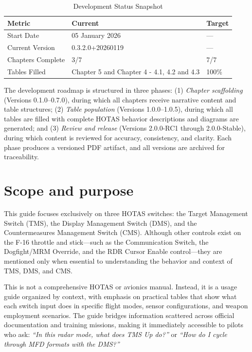 \documentclass[11pt, a4paper, twoside]{report}
\newcommand{\docversion}{0.3.2.0}
\newcommand{\docbuild}{20260119}
\newcommand{\docstartdate}{05 January 2026}
\newcommand{\chapterscompletedof}{3/7}
\newcommand{\tablesfilledpct}{Chapter 5 and Chapter 4 - 4.1, 4.2 and 4.3}
\newcommand{\fulldocversion}{\docversion+\docbuild}
\begin{document}
\begin{table}[h]
\centering
\caption{Development Status Snapshot}
\begin{tabular}{L{3.2cm} L{2.5cm} L{2.5cm}}
\toprule
\textbf{Metric} & \textbf{Current} & \textbf{Target} \\
\midrule
Start Date & \docstartdate & --- \\
Current Version & \fulldocversion & --- \\
Chapters Complete & \chapterscompletedof & 7/7 \\
Tables Filled & \tablesfilledpct & 100\% \\
\bottomrule
\end{tabular}
\end{table}

The development roadmap is structured in three phases: (1) \emph{Chapter scaffolding} (Versions 0.1.0--0.7.0), during which all chapters receive narrative content and table structures; (2) \emph{Table population} (Versions 1.0.0--1.0.5), during which all tables are filled with complete HOTAS behavior descriptions and diagrams are generated; and (3) \emph{Review and release} (Versions 2.0.0-RC1 through 2.0.0-Stable), during which content is reviewed for accuracy, consistency, and clarity. Each phase produces a versioned PDF artifact, and all versions are archived for traceability.

\section{Scope and purpose}
\label{sec:C1-S2}

This guide focuses exclusively on three HOTAS switches: the Target Management Switch (TMS), the Display Management Switch (DMS), and the Countermeasures Management Switch (CMS). Although other controls exist on the F-16 throttle and stick---such as the Communication Switch, the Dogfight/MRM Override, and the RDR Cursor Enable control---they are mentioned only when essential to understanding the behavior and context of TMS, DMS, and CMS.

This is not a comprehensive HOTAS or avionics manual. Instead, it is a usage guide organized by context, with emphasis on practical tables that show what each switch input does in specific flight modes, sensor configurations, and weapon employment scenarios. The guide bridges information scattered across official documentation and training missions, making it immediately accessible to pilots who ask: \emph{``In this radar mode, what does TMS Up do?''} or \emph{``How do I cycle through MFD formats with the DMS?''}
\end{document}
